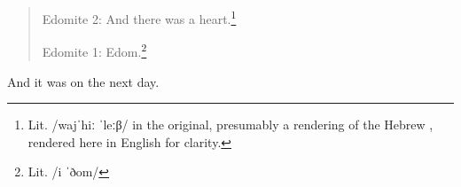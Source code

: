 \Sentence
{ \hX{} }
{ \eX{} }
{
\begin{quote}
    Edomite 2: And there was a heart.\footnote{Lit. /wajˈhiː ˈleːβ/ in the original, presumably a rendering of the Hebrew , rendered here in English for clarity.}

    Edomite 1: Edom.\footnote{Lit. /i ˈðom/}
\end{quote}
}

\Sentence
{ \hX{} }
{ \eX{} }
{ And it was on the next day. }
